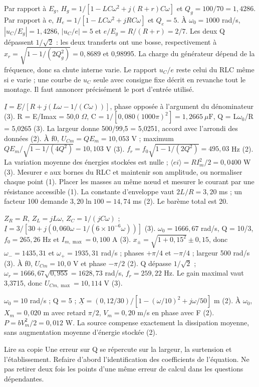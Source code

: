 Par rapport à $E_g$, $H_g=1/[1-LC\omega^2+j(R+r)C\omega]$ et $Q_g=100/70=1{,}4286$. Par rapport à e, $H_e=1/[1-LC\omega^2+jRC\omega]$ et $Q_e=5$. À $\omega_0=1000$ rad/s, $|u_C/E_g|=1{,}4286$, $|u_C/e|=5$ et $e/E_g=R/(R+r)=2/7$. Les deux Q dépassent $1/\sqrt2$ : les deux transferts ont une bosse, respectivement à $x_r=\sqrt{1-1/(2Q_g^2)}=0{,}8689$ et 0,98995. La charge du générateur dépend de la fréquence, donc sa chute interne varie. Le rapport $u_C/e$ reste celui du RLC même si e varie ; une courbe de $u_C$ seule avec consigne fixe décrit en revanche tout le montage. Il faut annoncer précisément le port d’entrée utilisé.

$\underline I=\underline E/[R+j(L\omega-1/(C\omega))]$, phase opposée à l’argument du dénominateur (3). R = E/Imax = 50,0 $\Omega$, C = $1/[0{,}080(1000\pi)^2]=1{,}2665\ \mu\mathrm F$, Q = L\ensuremath{\omega_0}/R = 5,0265 (3). La largeur donne 500/99,5 = 5,0251, accord avec l’arrondi des données (2).
À f0, $U_{Cm}=QE_m=10{,}053$ V ; maximum $QE_m/\sqrt{1-1/(4Q^2)}=10{,}103$ V (3). $f_r=f_0\sqrt{1-1/(2Q^2)}=495{,}03$ Hz (2). La variation moyenne des énergies stockées est nulle ; $\langle ei\rangle=RI_m^2/2=0{,}0400$ W (3).
Mesurer e aux bornes du RLC et maintenir son amplitude, ou normaliser chaque point (1). Placer les masses au même nœud et mesurer le courant par une résistance accessible (1). La constante d’enveloppe vaut $2L/R=3{,}20$ ms ; un facteur 100 demande $3{,}20\ln100=14{,}74$ ms (2). Le barème total est 20.


$Z_R=R$, $Z_L=jL\omega$, $Z_C=1/(jC\omega)$ ; $\underline I=3/[30+j(0{,}060\omega-1/(6\times10^{-6}\omega))]$ (3). $\omega_0=1666{,}67$ rad/s, Q = 10/3, $f_0=265{,}26$ Hz et $I_{m,\max}=0{,}100$ A (3).
$x_\pm=\sqrt{1+0{,}15^2}\pm0{,}15$, donc $\omega_-=1435{,}31$ et $\omega_+=1935{,}31$ rad/s ; phases $+\pi/4$ et $-\pi/4$ ; largeur 500 rad/s (3). À f0, $U_{Cm}=10{,}0$ V et phase $-\pi/2$ (2). Q dépasse $1/\sqrt2$ ; $\omega_r=1666{,}67\sqrt{0{,}955}=1628{,}73$ rad/s, $f_r=259{,}22$ Hz. Le gain maximal vaut 3,3715, donc $U_{Cm,\max}=10{,}114$ V (3).


$\omega_0=10$ rad/s ; Q = 5 ; $\underline X=(0{,}12/30)/[1-(\omega/10)^2+j\omega/50]$ m (2). À $\omega_0$, $X_m=0{,}020$ m avec retard $\pi/2$, $V_m=0{,}20$ m/s en phase avec F (2). $P=bV_m^2/2=0{,}012$ W. La source compense exactement la dissipation moyenne, sans augmentation moyenne d’énergie stockée (2).
\begin{methode}{Lire sa copie}
Une erreur sur Q se répercute sur la largeur, la surtension et l’établissement. Refaire d’abord l’identification des coefficients de l’équation. Ne pas retirer deux fois les points d’une même erreur de calcul dans les questions dépendantes.
\end{methode}


